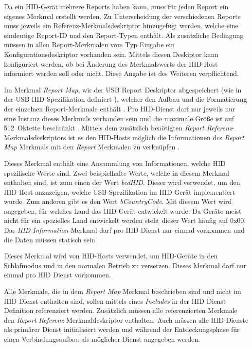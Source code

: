 Da ein \acs{HID}-Gerät mehrere Reports haben kann, muss für jeden Report ein eigenes Merkmal erstellt werden. Zu Unterscheidung der verschiedenen Reports muss jeweils ein Referenz-Merkmalsdeskriptor hinzugefügt werden, welche eine eindeutige Report-ID und den Report-Typen enthält. Als zusätzliche Bedingung müssen in allen Report-Merkmalen vom Typ Eingabe ein Konfigurationsdeskriptor vorhanden sein. Mittels diesen Deskiptor kann konfiguriert werden, ob bei Änderung des Merkmalswerts der \acs{HID}-Host informiert werden soll oder nicht. Diese Angabe ist des Weiteren verpflichtend. \cite[S.~14.f]{bluetoothHIDS}

Im Merkmal \textit{Report Map}, wir der USB Report Deskriptor abgespeichert (wie in der USB \acs{HID} Spezifikation definiert \cite[S.~21]{bluetoothHOGP}), welcher den Aufbau und die Formatierung der einzelnen Report-Merkmale enthält \cite[S.~11]{bluetoothHIDS}. Pro \acs{HID}-Dienst darf nur jeweils nur eine Instanz dieses Merkmals vorhanden sein und die maximale Größe ist auf 512~Oktette beschränkt \cite[S.~16]{bluetoothHIDS}. Mittels dem zusätzlich benötigten \textit{Report Referenz}-Merkmalsdeskriptors ist es den \acs{HID}-Hosts möglich die Informationen des \textit{Report Map} Merkmals mit den \textit{Report} Merkmalen zu verknüpfen \cite[S.~17]{bluetoothHIDS}.

Dieses Merkmal enthält eine Ansammlung von Informationen, welche \acs{HID} spezifische Werte sind. Zwei beispielhafte Werte, welche in diesem Merkmal enthalten sind, ist zum einen der Wert \textit{bcdHID}. Dieser wird verwendet, um den \acs{HID}-Host anzuzeigen, welche USB-Spezifikation im \acs{HID}-Gerät implementiert wurde. Zum anderen gibt es den Wert \textit{bCountryCode}. Mit diesem Wert wird angegeben, für welches Land das \acs{HID}-Gerät entwickelt wurde. Da Geräte meist nicht für ein spezielles Land entwickelt werden steht dieser Wert häufig auf 0x00. Das \textit{\acs{HID} Information} Merkmal darf pro \acs{HID} Dienst nur einmal vorkommen und die Daten müssen statisch sein. \cite[S.~20f.]{bluetoothHIDS}

Dieses Merkmal wird von \acs{HID}-Hosts verwendet, um \acs{HID}-Geräte in den Schlafmodus und in den normalen Betrieb zu versetzen. Dieses Merkmal darf nur einmal pro \acs{HID} Dienst vorkommen. \cites[S.~23]{bluetoothHOGP}[S.~21]{bluetoothHIDS}

Alle Merkmale, die in dem \textit{Report Map} Merkmal beschrieben sind und nicht im \acs{HID} Dienst enthalten sind, sollen mittels eines \textit{Includes} in der \acs{HID} Dienst Definition referenziert werden. Zusätzlich müssen alle referenzierten Merkmale den \textit{Report Referenz} Merkmaldeskriptor enthalten. Auch müssen alle \acs{HID}-Dienste als primärer Dienst initialisiert werden und während der Entdeckungsphase für einen Verbindungsaufbau als möglicher Dienst angegeben werden. \cite[S.~13f.]{bluetoothHOGP}

